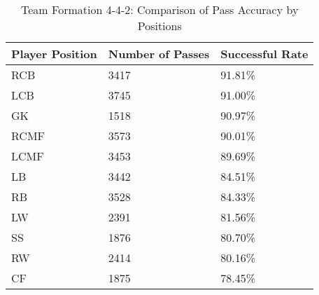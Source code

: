 \begin{table}[!htbp]
\centering
\begin{tabular}{@{}lll@{}}
\toprule
Player Position & Number of Passes & Successful Rate \\ \midrule
RCB              & 3417        & 91.81\% \\
LCB              & 3745        & 91.00\% \\
GK               & 1518        & 90.97\% \\
RCMF             & 3573        & 90.01\% \\
LCMF             & 3453        & 89.69\% \\
LB               & 3442        & 84.51\% \\
RB               & 3528        & 84.33\% \\
LW               & 2391        & 81.56\% \\
SS               & 1876        & 80.70\% \\
RW               & 2414        & 80.16\% \\
CF               & 1875        & 78.45\% \\ \bottomrule
\end{tabular}
\caption{Team Formation 4-4-2: Comparison of Pass Accuracy by Positions}
\label{tab:442_accuracy_positions}
\end{table}